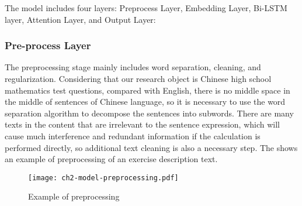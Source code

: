 The model includes four layers: Preprocess Layer, Embedding Layer, Bi-LSTM layer, Attention Layer, and Output Layer:
\subsubsection{Pre-process Layer}




The preprocessing stage mainly includes word separation, cleaning, and regularization. Considering that our research object is Chinese high school mathematics test questions, compared with English, there is no middle space in the middle of sentences of Chinese language, so it is necessary to use the word separation algorithm to decompose the sentences into subwords. There are many texts in the content that are irrelevant to the sentence expression, which will cause much interference and redundant information if the calculation is performed directly, so additional text cleaning is also a necessary step. The \figname{\ref{fig:ch2-model-preprocessing}} shows an example of preprocessing of an exercise description text.

\begin{figure}[htbp!]
    \centering
    \texttt{[image: ch2-model-preprocessing.pdf]}
    \caption{Example of preprocessing}\label{fig:ch2-model-preprocessing}
\end{figure}

